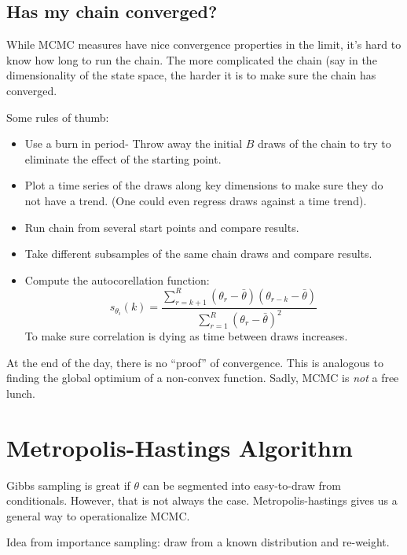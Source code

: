 \documentclass[twoside]{article}
\begin{document}
\subsection{Has my chain converged?}

While MCMC measures have nice convergence properties in the limit, it's hard to know how long to run the chain.  The more complicated the chain (say in the dimensionality of the state space, the harder it is to make sure the chain has converged. 

Some rules of thumb: 
\begin{itemize}
\item Use a burn in period- Throw away the initial $B$ draws of the chain to try to eliminate the effect of the starting point. 
\item Plot a time series of the draws along key dimensions to make sure they do not have a trend. (One could even regress draws against a time trend). 
\item Run chain from several start points and compare results. 
\item Take different subsamples of the same chain draws and compare results.
\item Compute the autocorellation function: 
$$s_{\theta_i}(k) = \frac{ \sum_{r = k+1}^R (\theta_r - \bar{\theta})(\theta_{r-k} - \bar{\theta})}{ \sum_{r=1}^R  (\theta_r - \bar{\theta})^2} $$
To make sure correlation is dying as time between draws increases. 
\end{itemize}

At the end of the day, there is no ``proof'' of convergence. This is analogous to finding the global optimium of a non-convex function. 
Sadly, MCMC is \emph{not} a free lunch.

\section{Metropolis-Hastings Algorithm}

Gibbs sampling is great if $\theta$ can be segmented into easy-to-draw from conditionals. However, that is not always the case. 
Metropolis-hastings gives us a general way to operationalize MCMC. 

Idea from importance sampling: draw from a known distribution and re-weight. 
\end{document}

